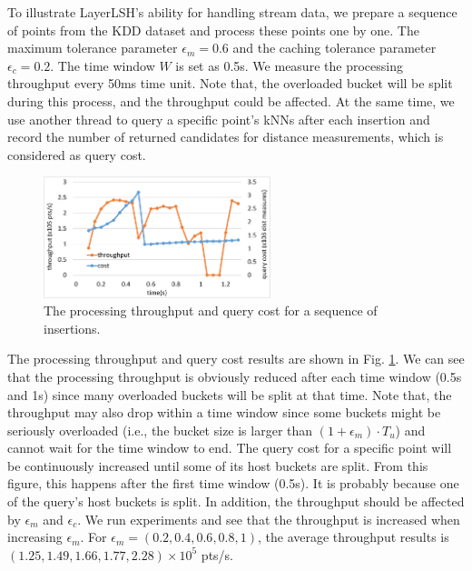 To illustrate LayerLSH's ability for handling stream data, we prepare a sequence of points from the KDD dataset and process these points one by one. The maximum tolerance parameter $\epsilon_m=0.6$ and the caching tolerance parameter $\epsilon_c=0.2$. The time window $W$ is set as 0.5s. We measure the processing throughput every 50ms time unit. Note that, the overloaded bucket will be split during this process, and the throughput could be affected. At the same time, we use another thread to query a specific point's kNNs after each insertion and record the number of returned candidates for distance measurements, which is considered as query cost.

\begin{figure}[t]
    \centerline{\includegraphics[width=2.6in]{fig/streaminsert.eps}}
    \caption{The processing throughput and query cost for a sequence of insertions.}
    \label{fig:streaminsert}
\end{figure}

The processing throughput and query cost results are shown in Fig. \ref{fig:streaminsert}. We can see that the processing throughput is obviously reduced after each time window (0.5s and 1s) since many overloaded buckets will be split at that time. Note that, the throughput may also drop within a time window since some buckets might be seriously overloaded (i.e., the bucket size is larger than $(1+\epsilon_m)\cdot T_u$) and cannot wait for the time window to end. The query cost for a specific point will be continuously increased until some of its host buckets are split. From this figure, this happens after the first time window (0.5s). It is probably because one of the query's host buckets is split. In addition, the throughput should be affected by $\epsilon_m$ and $\epsilon_c$. We run experiments and see that the throughput is increased when increasing $\epsilon_m$. For $\epsilon_m=(0.2,0.4,0.6,0.8,1)$, the average throughput results is $(1.25,1.49,1.66,1.77,2.28)\times 10^5$ pts/s.


